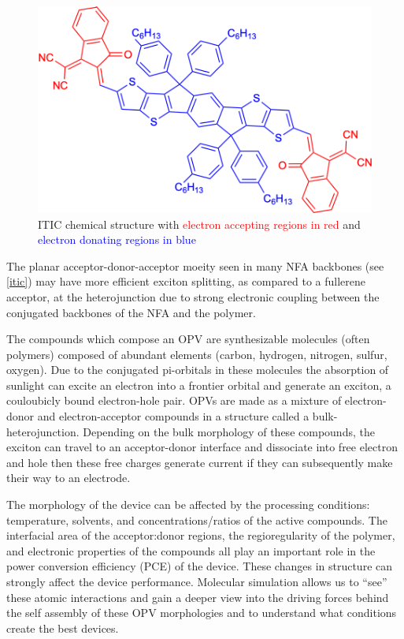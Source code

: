 \begin{figure}
    \centering
    \includegraphics[width=\linewidth]{images/ITIC.pdf}
    \caption{ITIC chemical structure with \textcolor{red}{electron accepting regions in red} and \textcolor{blue}{electron donating regions in blue}}\label{itic}
\end{figure}

The planar acceptor-donor-acceptor moeity seen in many NFA backbones (see \autoref{itic}) may have more efficient exciton splitting, as compared to a fullerene acceptor, at the heterojunction due to strong electronic coupling between the conjugated backbones of the NFA and the polymer\cite{Yi2018a}.

The compounds which compose an OPV are synthesizable molecules (often polymers) composed of abundant elements (carbon, hydrogen, nitrogen, sulfur, oxygen).
Due to the conjugated pi-orbitals in these molecules the absorption of sunlight can excite an electron into a frontier orbital and generate an exciton, a couloubicly bound electron-hole pair.
OPVs are made as a mixture of electron-donor and electron-acceptor compounds in a structure called a bulk-heterojunction.
Depending on the bulk morphology of these compounds, the exciton can travel to an acceptor-donor interface and dissociate into free electron and hole then these free charges generate current if they can subsequently make their way to an electrode.

The morphology of the device can be affected by the processing conditions: temperature, solvents, and concentrations/ratios of the active compounds\cite{Ma2005,Hoppe2004a,Li2007}.
The interfacial area of the acceptor:donor regions\cite{Mazzio2015}, the regioregularity of the polymer\cite{Kim2006}, and electronic properties of the compounds\cite{Scharber2006a} all play an important role in the power conversion efficiency (PCE) of the device. 
These changes in structure can strongly affect the device performance.
Molecular simulation allows us to ``see'' these atomic interactions and gain a deeper view into the driving forces behind the self assembly of these OPV morphologies and to understand what conditions create the best devices.

